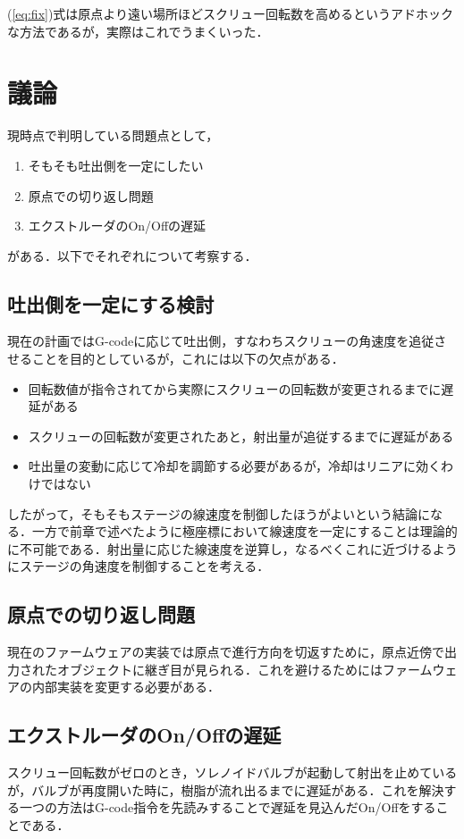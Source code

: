 \documentclass[twocolumn,oneside,a4paper]{article}
\begin{document}
(\ref{eq:fix})式は原点より遠い場所ほどスクリュー回転数を高めるというアドホックな方法であるが，実際はこれでうまくいった．

\section{議論}
現時点で判明している問題点として，

\begin{enumerate}
	\item そもそも吐出側を一定にしたい
	\item 原点での切り返し問題
	\item エクストルーダのOn/Offの遅延
\end{enumerate}

がある．以下でそれぞれについて考察する．

\subsection{吐出側を一定にする検討}
現在の計画ではG-codeに応じて吐出側，すなわちスクリューの角速度を追従させることを目的としているが，これには以下の欠点がある．

\begin{itemize}
    \item 回転数値が指令されてから実際にスクリューの回転数が変更されるまでに遅延がある
    \item スクリューの回転数が変更されたあと，射出量が追従するまでに遅延がある
	\item 吐出量の変動に応じて冷却を調節する必要があるが，冷却はリニアに効くわけではない
\end{itemize}

したがって，そもそもステージの線速度を制御したほうがよいという結論になる．一方で前章で述べたように極座標において線速度を一定にすることは理論的に不可能である．射出量に応じた線速度を逆算し，なるべくこれに近づけるようにステージの角速度を制御することを考える．

\subsection{原点での切り返し問題}
現在のファームウェアの実装では原点で進行方向を切返すために，原点近傍で出力されたオブジェクトに継ぎ目が見られる．これを避けるためにはファームウェアの内部実装を変更する必要がある．

\subsection{エクストルーダのOn/Offの遅延}
スクリュー回転数がゼロのとき，ソレノイドバルブが起動して射出を止めているが，バルブが再度開いた時に，樹脂が流れ出るまでに遅延がある．これを解決する一つの方法はG-code指令を先読みすることで遅延を見込んだOn/Offをすることである．
\end{document}
